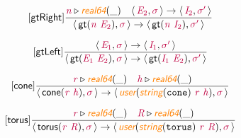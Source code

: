 \documentclass[10pt,leqno,fleqn]{article}
\newcommand{\artVariable}[1]{\mbox{\color{purple}\em #1\/}}
\newcommand{\artConstructor}[1]{\mbox{\sf #1}}
\newcommand{\artCaseInsensitiveLiteral}[1]{\mbox{\tt #1}}
\newcommand{\artSpecial}[1]{\mbox{\color{orange}\sf\em #1}}
\begin{document}
\begin{equation}
\tag*{[\artConstructor{\sf gtRight}]}
\begin{split}\frac{ \artVariable{n}\triangleright \artSpecial{real64}(\_) \quad \langle\, \artVariable{E$_{2}$}, \artVariable{$\sigma$}\,\rangle \rightarrow \langle\, \artVariable{I$_{2}$}, \artVariable{$\sigma$\/$^\prime$}\,\rangle }{\langle\, \artConstructor{\sf gt}(\artVariable{n}\ \artVariable{E$_{2}$}), \artVariable{$\sigma$}\,\rangle \rightarrow \langle\, \artConstructor{\sf gt}(\artVariable{n}\ \artVariable{I$_{2}$}), \artVariable{$\sigma$\/$^\prime$}\,\rangle }
\end{split}
\end{equation}

\begin{equation}
\tag*{[\artConstructor{\sf gtLeft}]}
\begin{split}\frac{\langle\, \artVariable{E$_{1}$}, \artVariable{$\sigma$}\,\rangle \rightarrow \langle\, \artVariable{I$_{1}$}, \artVariable{$\sigma$\/$^\prime$}\,\rangle }{\langle\, \artConstructor{\sf gt}(\artVariable{E$_{1}$}\ \artVariable{E$_{2}$}), \artVariable{$\sigma$}\,\rangle \rightarrow \langle\, \artConstructor{\sf gt}(\artVariable{I$_{1}$}\ \artVariable{E$_{2}$}), \artVariable{$\sigma$\/$^\prime$}\,\rangle }
\end{split}
\end{equation}

\begin{equation}
\tag*{[\artConstructor{\sf cone}]}
\begin{split}\frac{ \artVariable{r}\triangleright \artSpecial{real64}(\_) \quad  \artVariable{h}\triangleright \artSpecial{real64}(\_) }{\langle\, \artConstructor{\sf cone}(\artVariable{r}\ \artVariable{h}), \artVariable{$\sigma$}\,\rangle \rightarrow \langle\, \artSpecial{user}(\artSpecial{string}(\artCaseInsensitiveLiteral{cone})\ \artVariable{r}\ \artVariable{h}), \artVariable{$\sigma$}\,\rangle }
\end{split}
\end{equation}

\begin{equation}
\tag*{[\artConstructor{\sf torus}]}
\begin{split}\frac{ \artVariable{r}\triangleright \artSpecial{real64}(\_) \quad  \artVariable{R}\triangleright \artSpecial{real64}(\_) }{\langle\, \artConstructor{\sf torus}(\artVariable{r}\ \artVariable{R}), \artVariable{$\sigma$}\,\rangle \rightarrow \langle\, \artSpecial{user}(\artSpecial{string}(\artCaseInsensitiveLiteral{torus})\ \artVariable{r}\ \artVariable{R}), \artVariable{$\sigma$}\,\rangle }
\end{split}
\end{equation}
\end{document}
